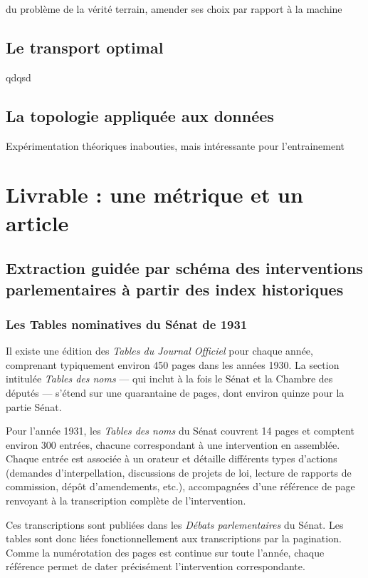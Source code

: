 du problème de la vérité terrain, amender ses choix par rapport à la machine

\section{Le transport optimal}

qdqsd

\section{La topologie appliquée aux données}

Expérimentation théoriques inabouties, mais intéressante pour l'entrainement



\chapter{Livrable : une métrique et un article}

\section{Extraction guidée par schéma des interventions parlementaires à partir des index historiques}

\subsection{Les Tables nominatives du Sénat de 1931}

Il existe une édition des \emph{Tables du Journal Officiel} pour chaque année, comprenant typiquement environ 450 pages dans les années 1930. La section intitulée \emph{Tables des noms} — qui inclut à la fois le Sénat et la Chambre des députés — s’étend sur une quarantaine de pages, dont environ quinze pour la partie Sénat.

Pour l’année 1931, les \emph{Tables des noms} du Sénat couvrent 14 pages et comptent environ 300 entrées, chacune correspondant à une intervention en assemblée. Chaque entrée est associée à un orateur et détaille différents types d’actions (demandes d’interpellation, discussions de projets de loi, lecture de rapports de commission, dépôt d’amendements, etc.), accompagnées d’une référence de page renvoyant à la transcription complète de l’intervention.

Ces transcriptions sont publiées dans les \emph{Débats parlementaires} du Sénat. Les tables sont donc liées fonctionnellement aux transcriptions par la pagination. Comme la numérotation des pages est continue sur toute l’année, chaque référence permet de dater précisément l’intervention correspondante.

